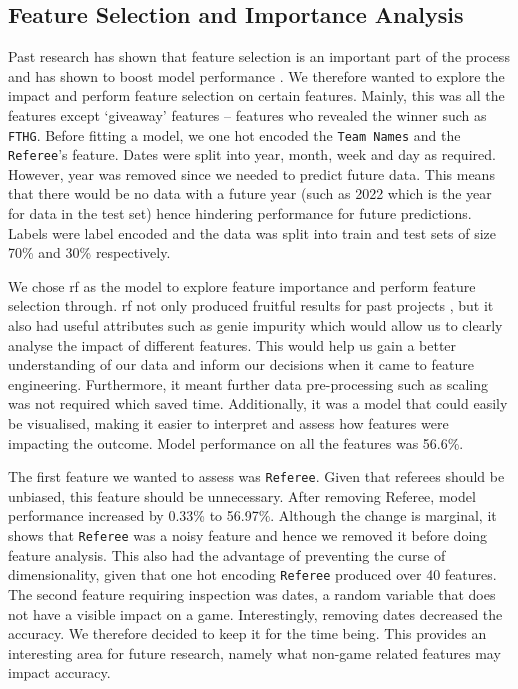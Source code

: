\documentclass{article}
\newcommand{\sw}[1]{\texttt{#1}}
\begin{document}
\subsection{Feature Selection and Importance Analysis}
\label{featureselection}

Past research has shown that feature selection is an important part of the process and has shown to boost model performance \cite{horvat2020use}. We therefore wanted to explore the impact and perform feature selection on certain features. Mainly, this was all the features except ‘giveaway’ features – features who revealed the winner such as \sw{FTHG}. Before fitting a model, we one hot encoded the \sw{Team Names} and the \sw{Referee}’s feature. Dates were split into year, month, week and day as required. However, year was removed since we needed to predict future data. This means that there would be no data with a future year (such as 2022 which is the year for data in the test set) hence hindering performance for future predictions. Labels were label encoded and the data was split into train and test sets of size 70\% and 30\% respectively.  

We chose \gls{rf} as the model to explore feature importance and perform feature selection through. \gls{rf} not only produced fruitful results for past projects \cite{horvat2020use}, but it also had useful attributes such as genie impurity \cite{dubeymediumrandomforest} which would allow us to clearly analyse the impact of different features. This would help us gain a better understanding of our data and inform our decisions when it came to feature engineering. Furthermore, it meant further data pre-processing such as scaling was not required which saved time. Additionally, it was a model that could easily be visualised, making it easier to interpret and assess how features were impacting the outcome. Model performance on all the features was 56.6\%.  

The first feature we wanted to assess was \sw{Referee}. Given that referees should be unbiased, this feature should be unnecessary. After removing Referee, model performance increased by 0.33\% to 56.97\%. Although the change is marginal, it shows that \sw{Referee} was a noisy feature and hence we removed it before doing feature analysis. This also had the advantage of preventing the curse of dimensionality, given that one hot encoding \sw{Referee} produced over 40 features. The second feature requiring inspection was dates, a random variable that does not have a visible impact on a game. Interestingly, removing dates decreased the accuracy. We therefore decided to keep it for the time being. This provides an interesting area for future research, namely what non-game related features may impact accuracy. 
\end{document}
